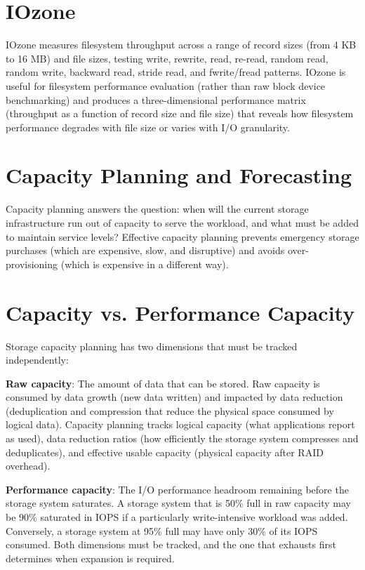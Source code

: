 \section{IOzone}
IOzone measures filesystem throughput across a range of record sizes (from 4 KB to 16 MB) and file sizes, testing write, rewrite, read, re-read, random read, random write, backward read, stride read, and fwrite/fread patterns. IOzone is useful for filesystem performance evaluation (rather than raw block device benchmarking) and produces a three-dimensional performance matrix (throughput as a function of record size and file size) that reveals how filesystem performance degrades with file size or varies with I/O granularity.

\section{Capacity Planning and Forecasting}
Capacity planning answers the question: when will the current storage infrastructure run out of capacity to serve the workload, and what must be added to maintain service levels? Effective capacity planning prevents emergency storage purchases (which are expensive, slow, and disruptive) and avoids over-provisioning (which is expensive in a different way).

\section{Capacity vs. Performance Capacity}
Storage capacity planning has two dimensions that must be tracked independently:

\textbf{Raw capacity}: The amount of data that can be stored. Raw capacity is consumed by data growth (new data written) and impacted by data reduction (deduplication and compression that reduce the physical space consumed by logical data). Capacity planning tracks logical capacity (what applications report as used), data reduction ratios (how efficiently the storage system compresses and deduplicates), and effective usable capacity (physical capacity after RAID overhead).

\textbf{Performance capacity}: The I/O performance headroom remaining before the storage system saturates. A storage system that is 50\% full in raw capacity may be 90\% saturated in IOPS if a particularly write-intensive workload was added. Conversely, a storage system at 95\% full may have only 30\% of its IOPS consumed. Both dimensions must be tracked, and the one that exhausts first determines when expansion is required.


